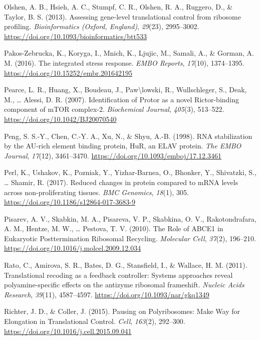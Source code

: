 \documentclass[12pt,openany]{book}
\begin{document}
\hypertarget{ref-Olshen2013}{}
Olshen, A. B., Hsieh, A. C., Stumpf, C. R., Olshen, R. A., Ruggero, D.,
\& Taylor, B. S. (2013). Assessing gene-level translational control from
ribosome profiling. \emph{Bioinformatics (Oxford, England)},
\emph{29}(23), 2995--3002.
\url{https://doi.org/10.1093/bioinformatics/btt533}

\hypertarget{ref-Pakos-Zebrucka2016}{}
Pakos-Zebrucka, K., Koryga, I., Mnich, K., Ljujic, M., Samali, A., \&
Gorman, A. M. (2016). The integrated stress response. \emph{EMBO
Reports}, \emph{17}(10), 1374--1395.
\url{https://doi.org/10.15252/embr.201642195}

\hypertarget{ref-Pearce2007}{}
Pearce, L. R., Huang, X., Boudeau, J., Paw\textbackslash{}lowski, R.,
Wullschleger, S., Deak, M., \ldots{} Alessi, D. R. (2007).
Identification of Protor as a novel Rictor-binding component of mTOR
complex-2. \emph{Biochemical Journal}, \emph{405}(3), 513--522.
\url{https://doi.org/10.1042/BJ20070540}

\hypertarget{ref-Peng1998}{}
Peng, S. S.-Y., Chen, C.-Y. A., Xu, N., \& Shyu, A.-B. (1998). RNA
stabilization by the AU-rich element binding protein, HuR, an ELAV
protein. \emph{The EMBO Journal}, \emph{17}(12), 3461--3470.
\url{https://doi.org/10.1093/emboj/17.12.3461}

\hypertarget{ref-Perl2017}{}
Perl, K., Ushakov, K., Pozniak, Y., Yizhar-Barnea, O., Bhonker, Y.,
Shivatzki, S., \ldots{} Shamir, R. (2017). Reduced changes in protein
compared to mRNA levels across non-proliferating tissues. \emph{BMC
Genomics}, \emph{18}(1), 305.
\url{https://doi.org/10.1186/s12864-017-3683-9}

\hypertarget{ref-Pisarev2010}{}
Pisarev, A. V., Skabkin, M. A., Pisareva, V. P., Skabkina, O. V.,
Rakotondrafara, A. M., Hentze, M. W., \ldots{} Pestova, T. V. (2010).
The Role of ABCE1 in Eukaryotic Posttermination Ribosomal Recycling.
\emph{Molecular Cell}, \emph{37}(2), 196--210.
\url{https://doi.org/10.1016/j.molcel.2009.12.034}

\hypertarget{ref-Rato2011}{}
Rato, C., Amirova, S. R., Bates, D. G., Stansfield, I., \& Wallace, H.
M. (2011). Translational recoding as a feedback controller: Systems
approaches reveal polyamine-specific effects on the antizyme ribosomal
frameshift. \emph{Nucleic Acids Research}, \emph{39}(11), 4587--4597.
\url{https://doi.org/10.1093/nar/gkq1349}

\hypertarget{ref-Richter2015}{}
Richter, J. D., \& Coller, J. (2015). Pausing on Polyribosomes: Make Way
for Elongation in Translational Control. \emph{Cell}, \emph{163}(2),
292--300. \url{https://doi.org/10.1016/j.cell.2015.09.041}
\end{document}
